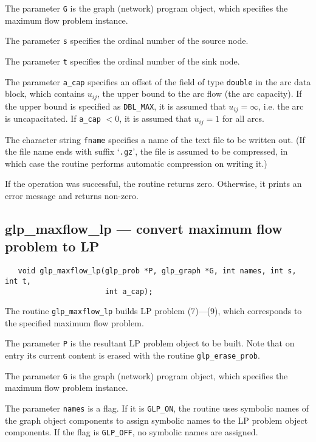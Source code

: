 \documentclass[11pt]{report}
\def\para#1{\noindent{\bf#1}}
\def\synopsis{\para{Synopsis}}
\def\description{\para{Description}}
\def\returns{\para{Returns}}
\begin{document}
The parameter \verb|G| is the graph (network) program object, which
specifies the maximum flow problem instance.

The parameter \verb|s| specifies the ordinal number of the source node.

The parameter \verb|t| specifies the ordinal number of the sink node.

The parameter \verb|a_cap| specifies an offset of the field of type
\verb|double| in the arc data block, which contains $u_{ij}$, the upper
bound to the arc flow (the arc capacity). If the upper bound is
specified as \verb|DBL_MAX|, it is assumed that $u_{ij}=\infty$, i.e.
the arc is uncapacitated. If \verb|a_cap| $<0$, it is assumed that
$u_{ij}=1$ for all arcs.

The character string \verb|fname| specifies a name of the text file to
be written out. (If the file name ends with suffix `\verb|.gz|', the
file is assumed to be compressed, in which case the routine performs
automatic compression on writing it.)

\returns

If the operation was successful, the routine returns zero. Otherwise,
it prints an error message and returns non-zero.

\newpage

\subsection{glp\_maxflow\_lp --- convert maximum flow problem to LP}

\synopsis

\begin{verbatim}
   void glp_maxflow_lp(glp_prob *P, glp_graph *G, int names, int s, int t,
                       int a_cap);
\end{verbatim}

\description

The routine \verb|glp_maxflow_lp| builds LP problem (7)---(9), which
corresponds to the specified maximum flow problem.

The parameter \verb|P| is the resultant LP problem object to be built.
Note that on entry its current content is erased with the routine
\verb|glp_erase_prob|.

The parameter \verb|G| is the graph (network) program object, which
specifies the maximum flow problem instance.

The parameter \verb|names| is a flag. If it is \verb|GLP_ON|, the
routine uses symbolic names of the graph object components to assign
symbolic names to the LP problem object components. If the flag is
\verb|GLP_OFF|, no symbolic names are assigned.
\end{document}
